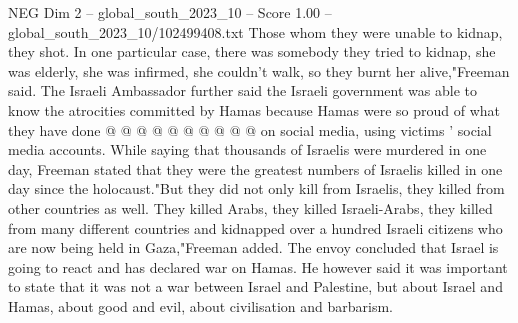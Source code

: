 \begin{textsample}{NEG Dim 2 – global\_south\_2023\_10 – Score 1.00 – global\_south\_2023\_10/102499408.txt}
Those whom they were unable to kidnap, they shot.
In one particular case, there was somebody they tried to kidnap, she was elderly, she was infirmed, she couldn't walk, so they burnt her alive,"Freeman said.
The Israeli Ambassador further said the Israeli government was able to know the atrocities committed by Hamas because Hamas were so proud of what they have done @ @ @ @ @ @ @ @ @ @ on social media, using victims ' social media accounts.
While saying that thousands of Israelis were murdered in one day, Freeman stated that they were the greatest numbers of Israelis killed in one day since the holocaust."But they did not only kill from Israelis, they killed from other countries as well.
They killed Arabs, they killed Israeli-Arabs, they killed from many different countries and kidnapped over a hundred Israeli citizens who are now being held in Gaza,"Freeman added.
The envoy concluded that Israel is going to react and has declared war on Hamas.
He however said it was important to state that it was not a war between Israel and Palestine, but about Israel and Hamas, about good and evil, about civilisation and barbarism.

\end{textsample}
